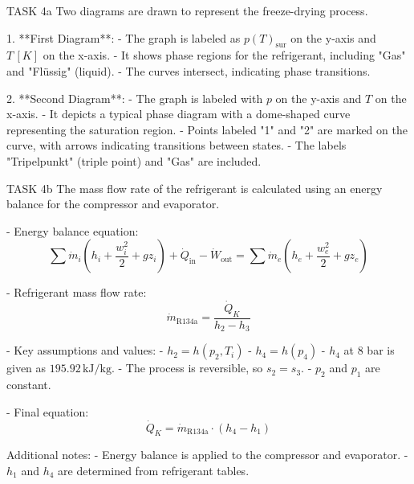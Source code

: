 TASK 4a  
Two diagrams are drawn to represent the freeze-drying process.  

1. **First Diagram**:  
   - The graph is labeled as \( p(T)_{\text{sur}} \) on the y-axis and \( T \, [K] \) on the x-axis.  
   - It shows phase regions for the refrigerant, including "Gas" and "Flüssig" (liquid).  
   - The curves intersect, indicating phase transitions.  

2. **Second Diagram**:  
   - The graph is labeled with \( p \) on the y-axis and \( T \) on the x-axis.  
   - It depicts a typical phase diagram with a dome-shaped curve representing the saturation region.  
   - Points labeled "1" and "2" are marked on the curve, with arrows indicating transitions between states.  
   - The labels "Tripelpunkt" (triple point) and "Gas" are included.  

TASK 4b  
The mass flow rate of the refrigerant is calculated using an energy balance for the compressor and evaporator.  

- Energy balance equation:  
  \[
  \sum \dot{m}_i \left( h_i + \frac{w_i^2}{2} + g z_i \right) + \dot{Q}_{\text{in}} - \dot{W}_{\text{out}} = \sum \dot{m}_e \left( h_e + \frac{w_e^2}{2} + g z_e \right)
  \]  

- Refrigerant mass flow rate:  
  \[
  \dot{m}_{\text{R134a}} = \frac{\dot{Q}_K}{h_2 - h_3}
  \]  

- Key assumptions and values:  
  - \( h_2 = h(p_2, T_i) \)  
  - \( h_4 = h(p_4) \)  
  - \( h_4 \) at 8 bar is given as \( 195.92 \, \text{kJ/kg} \).  
  - The process is reversible, so \( s_2 = s_3 \).  
  - \( p_2 \) and \( p_1 \) are constant.  

- Final equation:  
  \[
  \dot{Q}_K = \dot{m}_{\text{R134a}} \cdot (h_4 - h_1)
  \]  

Additional notes:  
- Energy balance is applied to the compressor and evaporator.  
- \( h_1 \) and \( h_4 \) are determined from refrigerant tables.